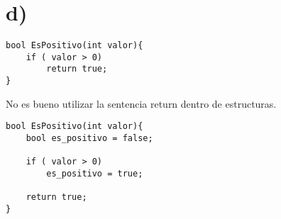 \documentclass[12pt]{article}
\begin{document}
\section*{d)}

\begin{lstlisting}
bool EsPositivo(int valor){
	if ( valor > 0)
		return true;
}
\end{lstlisting}

No es bueno utilizar la sentencia return dentro de estructuras.

\begin{lstlisting}
bool EsPositivo(int valor){
	bool es_positivo = false;
	
	if ( valor > 0)
		es_positivo = true;
		
	return true;
}
\end{lstlisting}
	
\end{document}
